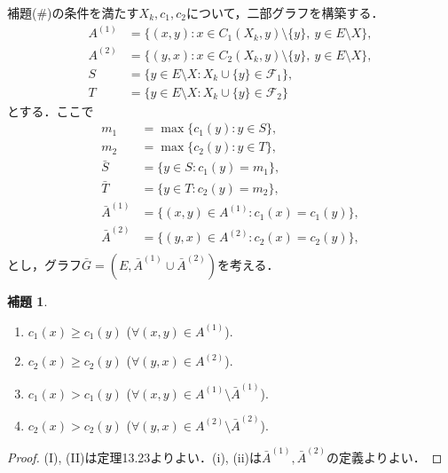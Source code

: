\documentclass[xelatex,ja=standard,a4paper,14pt,everyparhook=compat]{bxjsarticle}
\newcommand{\mcF}{\mathcal{F}}
\theoremstyle{definition}
\newtheorem*{lemma*}{補題}
\begin{document}
補題(\#)の条件を満たす$X_k,c_1,c_2$について，二部グラフを構築する． \begin{align*}
    A^{(1)} &= \{(x,y) : x \in C_1(X_k,y) \setminus \{y\},\ y \in E \setminus X\}, \\
    A^{(2)} &= \{(y,x) : x \in C_2(X_k,y) \setminus \{y\},\ y \in E \setminus X\}, \\
    S &= \{y \in E \setminus X : X_k \cup \{y\} \in \mcF_1\}, \\
    T &= \{y \in E \setminus X : X_k \cup \{y\} \in \mcF_2\}
\end{align*}
とする．ここで \begin{align*}
    m_1 &= \max \{c_1(y) : y \in S\}, \\
    m_2 &= \max \{c_2(y) : y \in T\}, \\
    \bar S &= \{y \in S : c_1(y) = m_1\}, \\
    \bar T &= \{y \in T : c_2(y) = m_2\}, \\
    \bar A^{(1)} &= \{(x,y) \in A^{(1)} : c_1(x) = c_1(y)\}, \\
    \bar A^{(2)} &= \{(y,x) \in A^{(2)} : c_2(x) = c_2(y)\}, \\
\end{align*}
とし，グラフ$\bar G = (E, \bar A^{(1)} \cup \bar A^{(2)})$を考える．

\begin{lemma*}
    \begin{enumerate}
        \item[(I)] $c_1(x) \geq c_1(y)$ ($\forall (x,y) \in A^{(1)}$).
        \item[(II)] $c_2(x) \geq c_2(y)$ ($\forall (y,x) \in A^{(2)}$).
        \item[(i)] $c_1(x) > c_1(y)$ ($\forall (x,y) \in A^{(1)} \setminus \bar A^{(1)}$).
        \item[(ii)] $c_2(x) > c_2(y)$ ($\forall (y,x) \in A^{(2)} \setminus \bar A^{(2)}$).
    \end{enumerate}
\end{lemma*}
\begin{proof}
    (I), (II)は定理13.23よりよい．(i), (ii)は$\bar A^{(1)}, \bar A^{(2)}$の定義よりよい．
\end{proof}

\newpage
\end{document}
